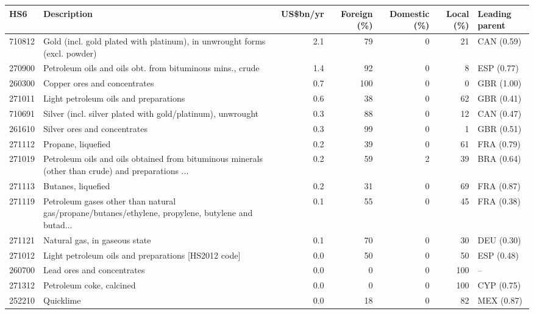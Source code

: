 \begin{tabular}{@{}l p{6.4cm} r r r r l@{}}
\toprule
HS6 & Description & US\$bn/yr & Foreign (\%) & Domestic (\%) & Local (\%) & Leading parent \\
\midrule
710812 & Gold (incl. gold plated with platinum), in unwrought forms (excl. powder) & 2.1 & 79 & 0 & 21 & CAN (0.59) \\
270900 & Petroleum oils and oils obt. from bituminous mins., crude & 1.4 & 92 & 0 & 8 & ESP (0.77) \\
260300 & Copper ores and concentrates & 0.7 & 100 & 0 & 0 & GBR (1.00) \\
271011 & Light petroleum oils and preparations & 0.6 & 38 & 0 & 62 & GBR (0.41) \\
710691 & Silver (incl. silver plated with gold/\allowbreak{}platinum), unwrought & 0.3 & 88 & 0 & 12 & CAN (0.47) \\
261610 & Silver ores and concentrates & 0.3 & 99 & 0 & 1 & GBR (0.51) \\
271112 & Propane, liquefied & 0.2 & 39 & 0 & 61 & FRA (0.79) \\
271019 & Petroleum oils and oils obtained from bituminous minerals (other than crude) and preparations ... & 0.2 & 59 & 2 & 39 & BRA (0.64) \\
271113 & Butanes, liquefied & 0.2 & 31 & 0 & 69 & FRA (0.87) \\
271119 & Petroleum gases other than natural gas/\allowbreak{}propane/\allowbreak{}butanes/\allowbreak{}ethylene, propylene, butylene and butad... & 0.1 & 55 & 0 & 45 & FRA (0.38) \\
271121 & Natural gas, in gaseous state & 0.1 & 70 & 0 & 30 & DEU (0.30) \\
271012 & Light petroleum oils and preparations [HS2012 code] & 0.0 & 50 & 0 & 50 & ESP (0.48) \\
260700 & Lead ores and concentrates & 0.0 & 0 & 0 & 100 & -- \\
271312 & Petroleum coke, calcined & 0.0 & 0 & 0 & 100 & CYP (0.75) \\
252210 & Quicklime & 0.0 & 18 & 0 & 82 & MEX (0.87) \\
\bottomrule
\end{tabular}
